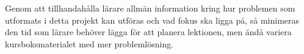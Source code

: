 \textcolor{Mahogany}{
    Genom att tillhandahålla lärare allmän information kring hur problemen som utformats i detta projekt kan utföras och vad fokus ska ligga på, så minimeras den tid som lärare behöver lägga för att planera lektionen, men ändå variera kursboksmaterialet med mer problemlösning.
}

